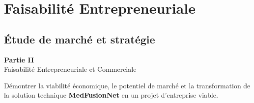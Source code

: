 \documentclass{beamer}
\begin{document}
\section{Faisabilité Entrepreneuriale}
\subsection{Étude de marché et stratégie}

\begin{frame}{}
\vfill
\begin{center}
{\Large\bfseries Partie II}\\[0.6em]
{\large Faisabilité Entrepreneuriale et Commerciale}\\[1.2em]
\begin{block}{}
\centering\scriptsize
Démontrer la viabilité économique, le potentiel de marché et la transformation de la solution technique \textbf{MedFusionNet} en un projet d'entreprise viable.
\end{block}
\end{center}
\vfill
\end{frame}
\end{document}

